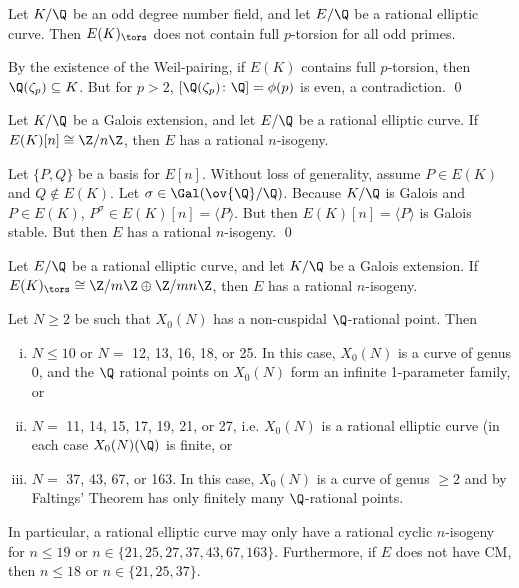 \begin{frame}[plain]
\footnotesize
\begin{lem}
Let $K/\Q$ be an odd degree number field, and let $E/\Q$ be a rational elliptic curve. Then $E(K)_\tors$ does not contain full $p$-torsion for all odd primes.
\end{lem}

\pf By the existence of the Weil-pairing, if $E(K)$ contains full $p$-torsion, then $\Q(\zeta_p) \subseteq K$. But for $p > 2$, $[\Q(\zeta_p) \colon \Q]= \phi(p)$ is even, a contradiction. \hfill \qed \vfill

\begin{lem}
Let $K/\Q$ be a Galois extension, and let $E/\Q$ be a rational elliptic curve. If $E(K)[n] \cong \Z/n\Z$, then $E$ has a rational $n$-isogeny. 
\end{lem}

\pf Let $\{ P, Q \}$ be a basis for $E[n]$. Without loss of generality, assume $P \in E(K)$ and $Q \notin E(K)$. Let $\sigma \in \Gal(\ov{\Q}/\Q)$. Because $K/\Q$ is Galois and $P \in E(K)$, $P^\sigma \in E(K)[n]= \langle P \rangle$. But then $E(K)[n]= \langle P \rangle$ is Galois stable. But then $E$ has a rational $n$-isogeny.  \hfill \qed \vfill

\begin{lem}
Let $E/\Q$ be a rational elliptic curve, and let $K/\Q$ be a Galois extension. If $E(K)_\tors \cong \Z/m\Z \oplus \Z/mn\Z$, then $E$ has a rational $n$-isogeny. 
\end{lem} \vfill
\end{frame}





\begin{frame}[plain]
\footnotesize
\begin{thm}
Let $N \geq 2$ be such that $X_0(N)$ has a non-cuspidal $\Q$-rational point. Then
	\begin{enumerate}[(i)]
	\item $N \leq 10$ or $N=$ 12, 13, 16, 18, or 25. In this case, $X_0(N)$ is a curve of genus 0, and the $\Q$ rational points on $X_0(N)$ form an infinite 1-parameter family, or
	\item $N=$ 11, 14, 15, 17, 19, 21, or 27, i.e. $X_0(N)$ is a rational elliptic curve (in each case $X_0(N)(\Q)$ is finite, or
	\item $N=$ 37, 43, 67, or 163. In this case, $X_0(N)$ is a curve of genus $\geq 2$ and by Faltings' Theorem has only finitely many $\Q$-rational points. 
	\end{enumerate}
In particular, a rational elliptic curve may only have a rational cyclic $n$-isogeny for $n \leq 19$ or $n \in \{ 21, 25, 27, 37, 43, 67,163\}$. Furthermore, if $E$ does not have CM, then $n \leq 18$ or $n \in \{ 21, 25, 37 \}$.
\end{thm}
\end{frame}






